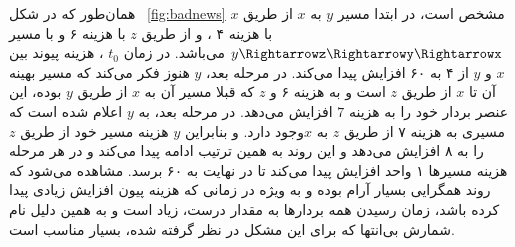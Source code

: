 همان‌طور که در شکل 
~\ref{fig:badnews}
مشخص است، در ابتدا مسیر $y$ به $x$ از طریق $x$ با هزینه ۴ ، و از طریق $z$‌ با هزینه ۶ و با مسیر $y\Rightarrowz\Rightarrowy\Rightarrowx$   می‌باشد. در زمان $t_{0}$ ، هزینه پیوند بین $x$ و $y$ از ۴ به ۶۰ افزایش پیدا می‌کند. در مرحله بعد، $y$ هنوز فکر می‌کند که مسیر بهینه آن تا $x$ از طریق $z$ است و به هزینه ۶ و  $z$ که قبلا مسیر آن به $x$ از طریق $y$ بوده، این عنصر بردار خود را به هزینه $7$ افزایش می‌دهد. در مرحله بعد، به  $y$  اعلام شده است که مسیری به هزینه ۷ از طریق $z$ به  $x$وجود دارد. و بنابراین $y$ هزینه مسیر خود از طریق $z$ را به ۸ افزایش می‌دهد و این روند به همین ترتیب ادامه پیدا می‌کند و در هر مرحله هزینه مسیرها ۱ واحد افزایش پیدا می‌کند تا در نهایت به ۶۰ برسد. مشاهده می‌شود که روند همگرایی بسیار آرام بوده و به ویژه در زمانی که هزینه پیون افزایش زیادی پیدا کرده باشد، زمان رسیدن همه بردارها به مقدار درست، زیاد است و به همین دلیل نام شمارش بی‌انتها که برای این مشکل در نظر گرفته شده، بسیار مناسب است. 
